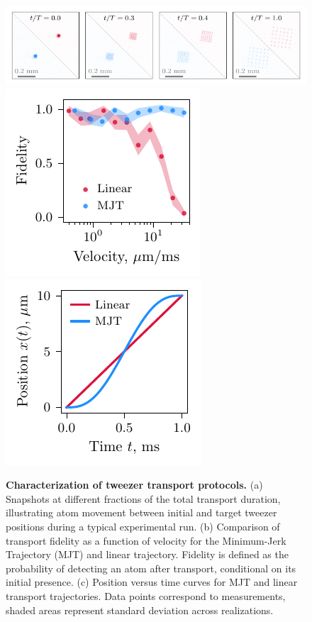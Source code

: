 \begin{figure}
\centering
{}
\includegraphics{fig-py/movement-inset.pdf} \\
\includegraphics{fig-py/movement-1.pdf}
\hspace{1cm}
\includegraphics{fig-py/movement-2.pdf}
\caption[Characterization of tweezer transport protocols]{
\textbf{Characterization of tweezer transport protocols.}
(a) Snapshots at different fractions of the total transport duration, illustrating atom movement between initial and target tweezer positions during a typical experimental run.
(b) Comparison of transport fidelity as a function of velocity for the Minimum-Jerk Trajectory (MJT) and linear trajectory. Fidelity is defined as the probability of detecting an atom after transport, conditional on its initial presence.
(c) Position versus time curves for MJT and linear transport trajectories.
Data points correspond to measurements, shaded areas represent standard deviation across realizations.
}
\label{fig:movement}
\end{figure}


